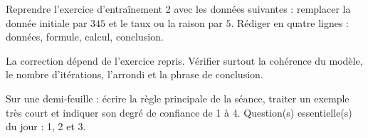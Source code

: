 
    \begin{homework}Reprendre l'exercice d'entraînement 2 avec les données suivantes : remplacer la donnée initiale par $345$ et le taux ou la raison par $5$. Rédiger en quatre lignes : données, formule, calcul, conclusion.\end{homework}
    \begin{solution}La correction dépend de l'exercice repris. Vérifier surtout la cohérence du modèle, le nombre d'itérations, l'arrondi et la phrase de conclusion.\end{solution}

    \begin{exitticket}[3 minutes]Sur une demi-feuille : écrire la règle principale de la séance, traiter un exemple très court et indiquer son degré de confiance de 1 à 4. Question(s) essentielle(s) du jour : 1, 2 et 3.\end{exitticket}

